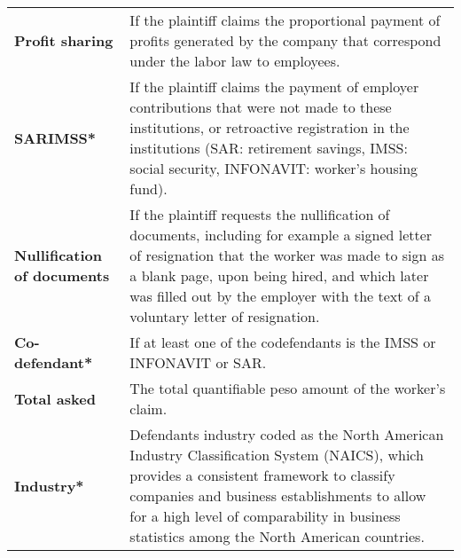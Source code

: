 \begin{tabular}{p{2cm}p{12cm}}
\textbf{Profit sharing} & If the plaintiff claims the proportional payment of profits generated by the company that correspond under the labor law to employees. \\
\textbf{SARIMSS*} & If the plaintiff claims the payment of employer contributions that were not made to these institutions, or retroactive registration in the institutions (SAR: retirement savings, IMSS: social security, INFONAVIT: worker's housing fund). \\
\textbf{Nullification of documents} & If the plaintiff requests the nullification of documents, including for example a signed letter of resignation that the worker was made to sign as a blank page, upon being hired, and which later was filled out by the employer with the text of a voluntary letter of resignation. \\
\textbf{Co-defendant*} & If at least one of the codefendants is the IMSS or INFONAVIT or SAR. \\
\textbf{Total asked} & The total quantifiable peso amount of the worker's claim. \\
\textbf{Industry*} & Defendants industry coded as the North American Industry Classification System (NAICS), which provides a consistent framework to classify companies and business establishments to allow for a high level of comparability in business statistics among the North American countries. \\
\bottomrule
\bottomrule
\end{tabular}%
